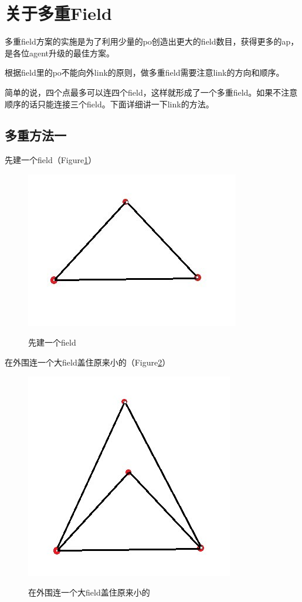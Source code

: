 \documentclass[12pt]{article}
\theoremstyle{definition}
\theoremstyle{remark}
\numberwithin{equation}{section}
\begin{document}
\section{关于多重Field}
多重field方案的实施是为了利用少量的po创造出更大的field数目，获得更多的ap，是各位agent升级的最佳方案。\par
根据field里的po不能向外link的原则，做多重field需要注意link的方向和顺序。\par
简单的说，四个点最多可以连四个field，这样就形成了一个多重field。如果不注意顺序的话只能连接三个field。下面详细讲一下link的方法。\par
\subsection{多重方法一}
先建一个field（Figure\ref{m11}） \par
\begin{figure}
  \centering
  \includegraphics[scale=0.5]{pictures/m11.png}\\
  \caption{先建一个field}
  \label{m11}
\end{figure}
在外围连一个大field盖住原来小的（Figure\ref{m12}） \par
\begin{figure}
  \centering
  \includegraphics[scale=0.5]{pictures/m12.png}\\
  \caption{在外围连一个大field盖住原来小的}
  \label{m12}
\end{figure}
\end{document}
